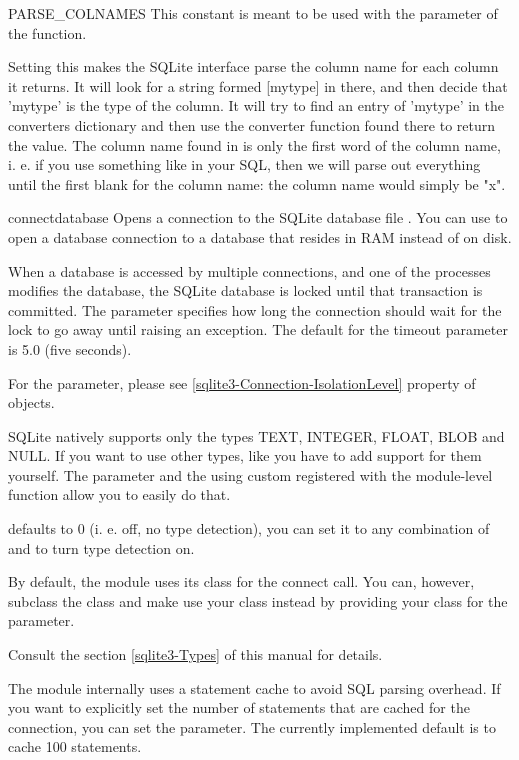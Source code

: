 \begin{datadesc}{PARSE_COLNAMES}
This constant is meant to be used with the  parameter of the
 function.

Setting this makes the SQLite interface parse the column name for each column
it returns.  It will look for a string formed [mytype] in there, and then
decide that 'mytype' is the type of the column. It will try to find an entry of
'mytype' in the converters dictionary and then use the converter function found
there to return the value. The column name found in  is only
the first word of the column name, i.  e. if you use something like
 in your SQL, then we will parse out everything until the
first blank for the column name: the column name would simply be "x".
\end{datadesc}

\begin{funcdesc}{connect}{database}
Opens a connection to the SQLite database file . You can use
 to open a database connection to a database that resides in
RAM instead of on disk.

When a database is accessed by multiple connections, and one of the processes
modifies the database, the SQLite database is locked until that transaction is
committed. The  parameter specifies how long the connection should
wait for the lock to go away until raising an exception. The default for the
timeout parameter is 5.0 (five seconds). 

For the  parameter, please see 
\ref{sqlite3-Connection-IsolationLevel} property of  objects.

SQLite natively supports only the types TEXT, INTEGER, FLOAT, BLOB and NULL. If
you want to use other types, like you have to add support for them yourself.
The  parameter and the using custom  registered with
the module-level  function allow you to easily do that.

 defaults to 0 (i. e. off, no type detection), you can set it
to any combination of  and  to turn type
detection on.

By default, the  module uses its  class for the
connect call.  You can, however, subclass the  class and make
 use your class instead by providing your class for the
 parameter.

Consult the section \ref{sqlite3-Types} of this manual for details.

The  module internally uses a statement cache to avoid SQL parsing
overhead. If you want to explicitly set the number of statements that are
cached for the connection, you can set the  parameter.
The currently implemented default is to cache 100 statements.
\end{funcdesc}

